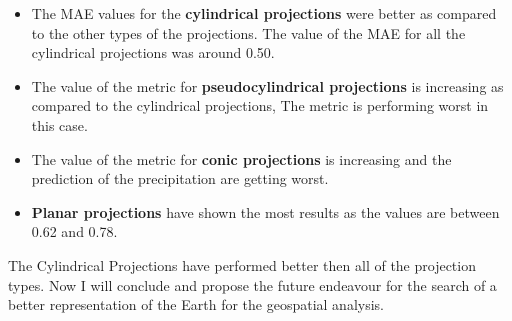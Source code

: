 \begin{itemize}
    \item The MAE values for the \textbf{cylindrical projections} were better as compared to the other types of the projections.
          The value of the MAE for all the cylindrical projections was around 0.50.
    \item The value of the metric for \textbf{pseudocylindrical projections} is increasing as compared to the cylindrical projections, The metric is performing worst in this case.
    \item The value of the metric for \textbf{conic projections} is increasing and the prediction of the precipitation are getting worst.
    \item \textbf{Planar projections} have shown the most results as the values are between 0.62 and 0.78.
\end{itemize}

The Cylindrical Projections have performed better then all of the projection types. Now I will conclude and propose the future endeavour for the search of a better representation of the Earth for the geospatial analysis.